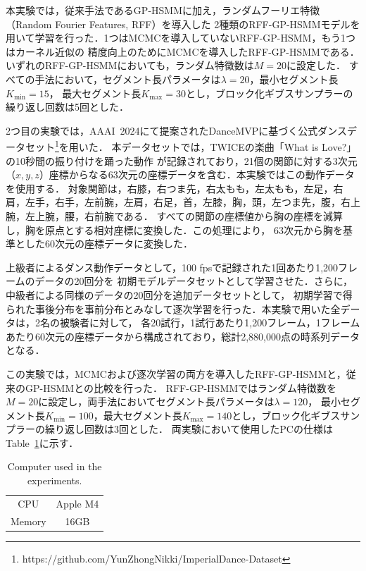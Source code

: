 \documentclass[conference]{IEEEtran}
\begin{document}
本実験では，従来手法であるGP-HSMMに加え，ランダムフーリエ特徴（Random Fourier Features, RFF）を導入した
2種類のRFF-GP-HSMMモデルを用いて学習を行った．1つはMCMCを導入していないRFF-GP-HSMM，もう1つはカーネル近似の
精度向上のためにMCMCを導入したRFF-GP-HSMMである．いずれのRFF-GP-HSMMにおいても，ランダム特徴数は$M=20$に設定した．
すべての手法において，セグメント長パラメータは$\lambda=20$，最小セグメント長$K_{\min}=15$，
最大セグメント長$K_{\max}=30$とし，ブロック化ギブスサンプラーの繰り返し回数は5回とした．

2つ目の実験では，AAAI~2024にて提案されたDanceMVP\cite{DanceMVP2024}に基づく公式ダンスデータセット\footnote{https://github.com/YunZhongNikki/ImperialDance-Dataset}を用いた．
本データセットでは，TWICEの楽曲「What is Love?」の10秒間の振り付けを踊った動作
が記録されており，21個の関節に対する3次元（$x, y, z$）座標からなる63次元の座標データを含む．本実験ではこの動作データを使用する．
対象関節は，右膝，右つま先，右太もも，左太もも，左足，右肩，左手，右手，左前腕，左肩，右足，首，左膝，胸，頭，左つま先，腹，右上腕，左上腕，腰，右前腕である．
すべての関節の座標値から胸の座標を減算し，胸を原点とする相対座標に変換した．この処理により，
63次元から胸を基準とした60次元の座標データに変換した．

上級者によるダンス動作データとして，100 fpsで記録された1回あたり1,200フレームのデータの20回分を
初期モデルデータセットとして学習させた．さらに，中級者による同様のデータの20回分を追加データセットとして，
初期学習で得られた事後分布を事前分布とみなして逐次学習を行った．本実験で用いた全データは，2名の被験者に対して，
各20試行，1試行あたり1,200フレーム，1フレームあたり60次元の座標データから構成されており，総計2,880,000点の時系列データ
となる．

この実験では，MCMCおよび逐次学習の両方を導入したRFF-GP-HSMMと，従来のGP-HSMMとの比較を行った．
RFF-GP-HSMMではランダム特徴数を$M=20$に設定し，両手法においてセグメント長パラメータは$\lambda=120$，
最小セグメント長$K_{\min}=100$，最大セグメント長$K_{\max}=140$とし，ブロック化ギブスサンプラーの繰り返し回数は3回とした．
両実験において使用したPCの仕様はTable~\ref{table:mac}に示す．

\begin{table}[t]
\caption{Computer used in the experiments.}
\label{table:mac}
 \centering
\begin{tabular}{cc}
    \hline
    CPU & Apple M4 \\
    Memory & 16GB \\
    \hline
\end{tabular}
\end{table}
\end{document}
